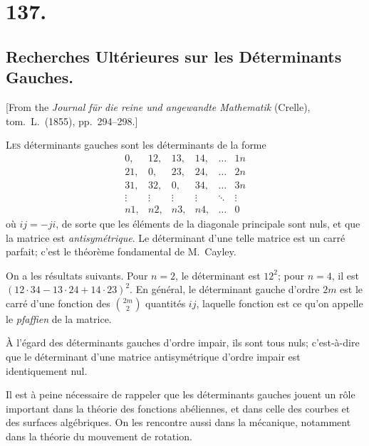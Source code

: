 \documentclass[11pt,a4paper]{article}
\theoremstyle{definition}
\begin{document}
\section*{137.}
\subsection*{Recherches Ult\'erieures sur les D\'eterminants Gauches.}

[From the \textit{Journal f\"ur die reine und angewandte Mathematik} (Crelle),
tom.\ L.\ (1855), pp.\ 294--298.]

\medskip

\textsc{Les} d\'eterminants gauches sont les d\'eterminants de la forme
\[
\begin{array}{|cccccc|}
0, & 12, & 13, & 14, & \ldots & 1n \\
21, & 0, & 23, & 24, & \ldots & 2n \\
31, & 32, & 0, & 34, & \ldots & 3n \\
\vdots & \vdots & \vdots & \vdots & \ddots & \vdots \\
n1, & n2, & n3, & n4, & \ldots & 0
\end{array}
\]
o\`u $ij = -ji$, de sorte que les \'el\'ements de la diagonale principale
sont nuls, et que la matrice est \textit{antisym\'etrique}. Le d\'eterminant
d'une telle matrice est un carr\'e parfait; c'est le th\'eor\`eme fondamental
de M.~Cayley.

\medskip

On a les r\'esultats suivants. Pour $n = 2$, le d\'eterminant est $12^2$;
pour $n = 4$, il est $(12\cdot 34 - 13\cdot 24 + 14\cdot 23)^2$. En
g\'en\'eral, le d\'eterminant gauche d'ordre $2m$ est le carr\'e d'une
fonction des $\binom{2m}{2}$ quantit\'es $ij$, laquelle fonction est ce
qu'on appelle le \textit{pfaffien} de la matrice.

\medskip

\`A l'\'egard des d\'eterminants gauches d'ordre impair, ils sont tous
nuls; c'est-\`a-dire que le d\'eterminant d'une matrice antisym\'etrique
d'ordre impair est identiquement nul.

\medskip

Il est \`a peine n\'ecessaire de rappeler que les d\'eterminants gauches
jouent un r\^ole important dans la th\'eorie des fonctions ab\'eliennes,
et dans celle des courbes et des surfaces alg\'ebriques. On les rencontre
aussi dans la m\'ecanique, notamment dans la th\'eorie du mouvement de
rotation.
\end{document}
